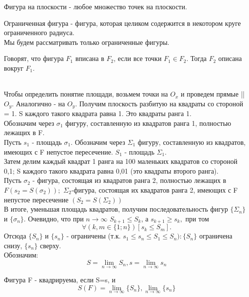 \begin{opred}
Фигура на плоскости - любое множество точек на плоскости.
\end{opred}

\begin{opred}
Ограниченная фигура - фигура, которая целиком содержится в некотором круге ограниченного радиуса.
\\
Мы будем рассматривать только ограниченные фигуры.
\end{opred}

\begin{opred}
Говорят, что фигура $F_1$ вписана в $F_2$, если все точки $F_1 \in F_2$. Тогда $F_2$ описана вокруг $F_1$.	
\end{opred}
\\
Чтобы определить понятие площади, возьмем точки на $O_x$ и проведем прямые || $O_y$. Аналогично - на $O_y$. Получим плоскость разбитую на квадраты со стороной = 1. S каждого такого квадрата равна 1. Это квадраты ранга 1.
\\
Обозначим через $\sigma_1$ фигуру, составленную из квадратов ранга 1, полностью лежащих в F.
\\
Пусть $s_1$ - площадь $\sigma_1$.
Обозначим через $\Sigma_1$ фигуру, составленную из квадратов, имеющих с F непустое пересечение. $S_1$ - площадь $\Sigma_1$.
\\
Затем делим каждый квадрат 1 ранга на 100 маленьких квадратов со стороной 0,1; S каждого такого квадрата равна 0,01 (это квадраты второго ранга).
\\
Пусть $\sigma_2$ - фигура, состоящая из квадратов ранга 2, полностью лежащих в $F(s_2=S(\sigma_2));$ $\Sigma_2$-фигура, состоящая их квадратов ранга 2, имеющих с F непустое пересечение $(S_2=S(\Sigma_2))$
\\
В итоге, уменьшая площадь квадратов, получим последовательность фигур $\{\Sigma_n\}$ и $\{\sigma_n\}$. Очевидно, что при $n \to \infty$ $S_{k+1} \leqslant S_k$, а $s_{k+1}\geqslant s_k,$ при том 
$$\forall (k,m \in \{1;n\})[s_k \leqslant S_m].$$
Отсюда $\{S_n\}$ и $\{s_n\}$ - ограничены (т.к. $s_1 \leq s_n \leq S_1 \leq S_n): \{S_n\}$ ограничена снизу, $\{s_n\}$ сверху.
\\
Обозначим:
$$
S=\lim_{n\to \infty}S_n, s=\lim_{n \to \infty}s_n
$$

\begin{opred}
Фигура F - квадрируема, если S=s, и
$$
S(F)=\lim_{n\to \infty}\{S_n\},\lim_{n \to \infty}\{s_n\}
$$
\end{opred}

